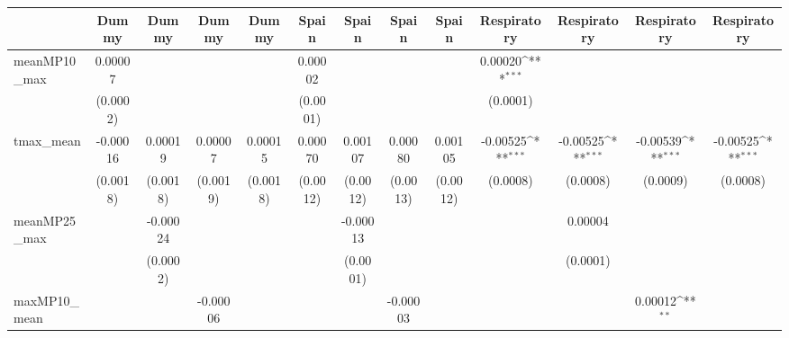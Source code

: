 {
\def\sym#1{\ifmmode^{#1}\else\(^{#1}\)\fi}
\begin{tabular}{l*{12}{c}}
\toprule
            &\multicolumn{1}{c}{Dummy}&\multicolumn{1}{c}{Dummy}&\multicolumn{1}{c}{Dummy}&\multicolumn{1}{c}{Dummy}&\multicolumn{1}{c}{Spain}&\multicolumn{1}{c}{Spain}&\multicolumn{1}{c}{Spain}&\multicolumn{1}{c}{Spain}&\multicolumn{1}{c}{Respiratory}&\multicolumn{1}{c}{Respiratory}&\multicolumn{1}{c}{Respiratory}&\multicolumn{1}{c}{Respiratory}\\
\midrule
meanMP10\_max&     0.00007         &                     &                     &                     &     0.00002         &                     &                     &                     &     0.00020\sym{***}&                     &                     &                     \\
            &    (0.0002)         &                     &                     &                     &    (0.0001)         &                     &                     &                     &    (0.0001)         &                     &                     &                     \\
tmax\_mean   &    -0.00016         &     0.00019         &     0.00007         &     0.00015         &     0.00070         &     0.00107         &     0.00080         &     0.00105         &    -0.00525\sym{***}&    -0.00525\sym{***}&    -0.00539\sym{***}&    -0.00525\sym{***}\\
            &    (0.0018)         &    (0.0018)         &    (0.0019)         &    (0.0018)         &    (0.0012)         &    (0.0012)         &    (0.0013)         &    (0.0012)         &    (0.0008)         &    (0.0008)         &    (0.0009)         &    (0.0008)         \\
meanMP25\_max&                     &    -0.00024         &                     &                     &                     &    -0.00013         &                     &                     &                     &     0.00004         &                     &                     \\
            &                     &    (0.0002)         &                     &                     &                     &    (0.0001)         &                     &                     &                     &    (0.0001)         &                     &                     \\
maxMP10\_mean&                     &                     &    -0.00006         &                     &                     &                     &    -0.00003         &                     &                     &                     &     0.00012\sym{**} &                     \\

\end{tabular}}
